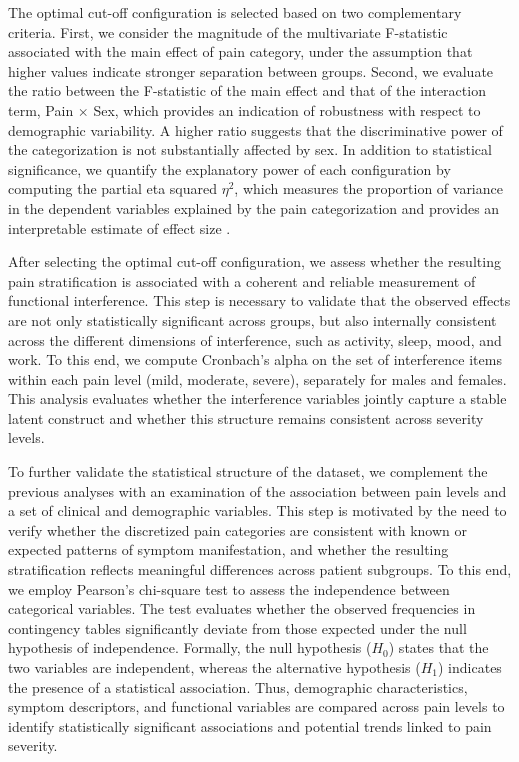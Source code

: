 \documentclass[preprint,12pt,authoryear]{elsarticle}
\begin{document}
The optimal cut-off configuration is selected based on two complementary criteria. First, we consider the magnitude of the multivariate F-statistic associated with the main effect of pain category, under the assumption that higher values indicate stronger separation between groups\citep{tabachnick2007using}. Second, we evaluate the ratio between the F-statistic of the main effect and that of the interaction term, Pain $\times$ Sex, which provides an indication of robustness with respect to demographic variability\citep{maxwell2017designing}. A higher ratio suggests that the discriminative power of the categorization is not substantially affected by sex. In addition to statistical significance, we quantify the explanatory power of each configuration by computing the partial eta squared $\eta^2$, which measures the proportion of variance in the dependent variables explained by the pain categorization and provides an interpretable estimate of effect size \citep{richardson2011eta}.

After selecting the optimal cut-off configuration, we assess whether the resulting pain stratification is associated with a coherent and reliable measurement of functional interference. This step is necessary to validate that the observed effects are not only statistically significant across groups, but also internally consistent across the different dimensions of interference, such as activity, sleep, mood, and work. To this end, we compute Cronbach’s alpha \citep{forero2024cronbach} on the set of interference items within each pain level (mild, moderate, severe), separately for males and females. This analysis evaluates whether the interference variables jointly capture a stable latent construct and whether this structure remains consistent across severity levels.

To further validate the statistical structure of the dataset, we complement the previous analyses with an examination of the association between pain levels and a set of clinical and demographic variables. This step is motivated by the need to verify whether the discretized pain categories are consistent with known or expected patterns of symptom manifestation, and whether the resulting stratification reflects meaningful differences across patient subgroups. To this end, we employ Pearson’s chi-square test to assess the independence between categorical variables. The test evaluates whether the observed frequencies in contingency tables significantly deviate from those expected under the null hypothesis of independence. Formally, the null hypothesis ($H_0$) states that the two variables are independent, whereas the alternative hypothesis ($H_1$) indicates the presence of a statistical association. Thus, demographic characteristics, symptom descriptors, and functional variables are compared across pain levels to identify statistically significant associations and potential trends linked to pain severity. 
\end{document}
